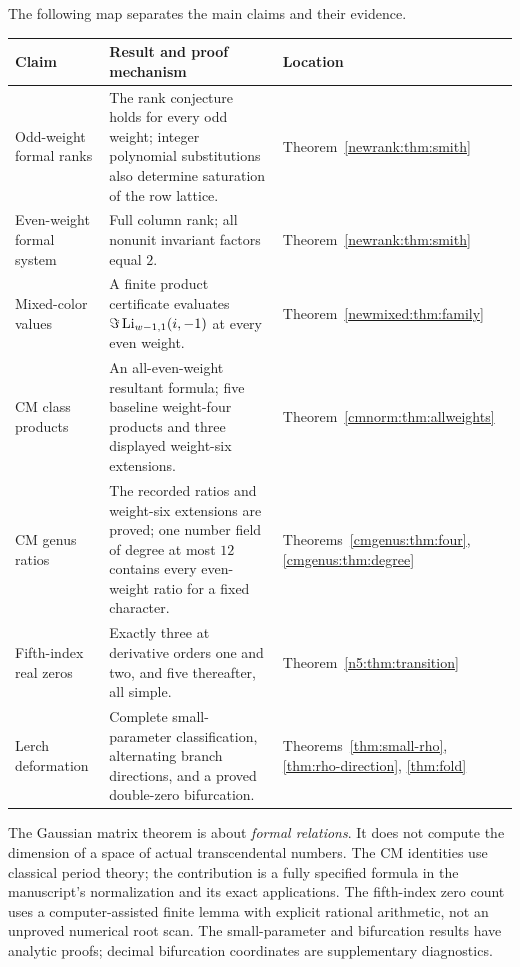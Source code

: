 The following map separates the main claims and their evidence.
\begin{center}
\small
\begin{tabularx}{\textwidth}{@{}>{\raggedright\arraybackslash}p{}>{\raggedright\arraybackslash}X>{\raggedright\arraybackslash}p{}@{}}
\toprule
Claim & Result and proof mechanism & Location\\
\midrule
Odd-weight formal ranks & The rank conjecture holds for every odd weight;
integer polynomial substitutions also determine saturation of the row
lattice. & Theorem~\ref{newrank:thm:smith}\\[3pt]
Even-weight formal system & Full column rank; all nonunit invariant
factors equal $2$. & Theorem~\ref{newrank:thm:smith}\\[3pt]
Mixed-color values & A finite product certificate evaluates
$\Im\operatorname{Li}_{w-1,1}(i,-1)$ at every even weight. &
Theorem~\ref{newmixed:thm:family}\\[3pt]
CM class products & An all-even-weight resultant formula; five baseline
weight-four products and three displayed weight-six extensions. &
Theorem~\ref{cmnorm:thm:allweights}\\[3pt]
CM genus ratios & The recorded ratios and weight-six extensions are
proved; one number field of degree at most $12$ contains every even-weight
ratio for a fixed character. & Theorems~\ref{cmgenus:thm:four},
\ref{cmgenus:thm:degree}\\[3pt]
Fifth-index real zeros & Exactly three at derivative orders one and two,
and five thereafter, all simple. & Theorem~\ref{n5:thm:transition}\\[3pt]
Lerch deformation & Complete small-parameter classification, alternating
branch directions, and a proved double-zero bifurcation. &
Theorems~\ref{thm:small-rho}, \ref{thm:rho-direction}, \ref{thm:fold}\\
\bottomrule
\end{tabularx}
\end{center}

The Gaussian matrix theorem is about \emph{formal relations}. It does not
compute the dimension of a space of actual transcendental numbers. The CM
identities use classical period theory; the contribution is a fully
specified formula in the manuscript's normalization and its exact
applications. The fifth-index zero count uses a computer-assisted finite
lemma with explicit rational arithmetic, not an unproved numerical root
scan. The small-parameter and bifurcation results have analytic proofs;
decimal bifurcation coordinates are supplementary diagnostics.

